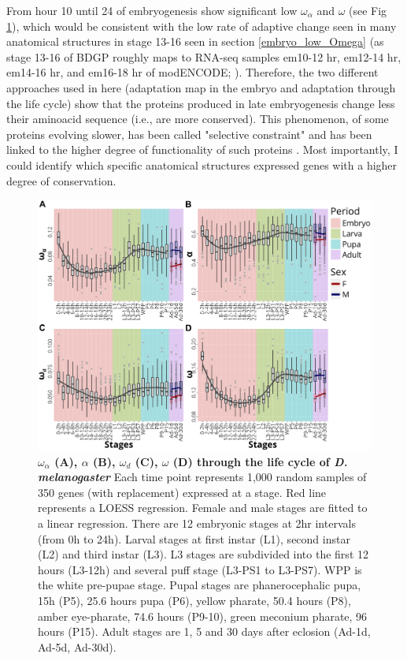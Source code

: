 From hour 10 until 24 of embryogenesis show significant low $\omega_{\alpha}$ and $\omega$ (see Fig \ref{fig:Art-IV-OmegaA_lifecycle}), which would be consistent with the low rate of adaptive change seen in many anatomical structures in stage 13-16 seen in section \ref{embryo_low_Omega} (as stage 13-16 of BDGP roughly maps to RNA-seq samples em10-12 hr, em12-14 hr, em14-16 hr, and em16-18 hr of modENCODE; \citealp{Hammonds2013}).
Therefore, the two different approaches used in here (adaptation map in the embryo and adaptation through the life cycle) show that the proteins produced in late embryogenesis change less their aminoacid sequence (i.e., are more conserved). 
This phenomenon, of some proteins evolving slower, has been called "selective constraint" and has been linked to the higher degree of functionality of such proteins \citep{kimura1983neutral}.
Most importantly, I could identify which specific anatomical structures expressed genes with a higher degree of conservation.

\begin{figure}[t]
  \includegraphics[width=\textwidth]{./Images/Art-IV/OmegaA_lifecycle.png}
  \centering
  \caption{\textbf{ {\large$\omega_{\alpha}$} (A),  {\large$\alpha$} (B), {\large$\omega_{d}$} (C), {\large$\omega$} (D) through the life cycle of \textit{D. melanogaster}} Each time point represents 1,000 random samples of 350 genes (with replacement) expressed at a stage. Red line represents a LOESS regression. Female and male stages are fitted to a linear regression. There are 12 embryonic stages at 2hr intervals (from 0h to 24h). Larval stages at first instar (L1), second instar (L2) and third instar (L3). L3 stages are subdivided into the first 12 hours (L3-12h) and several puff stage (L3-PS1 to L3-PS7). WPP is the white pre-pupae stage. Pupal stages are phanerocephalic pupa, 15h (P5), 25.6 hours pupa (P6), yellow pharate, 50.4 hours (P8), amber eye-pharate, 74.6 hours (P9-10), green meconium pharate, 96 hours (P15). Adult stages are 1, 5 and 30 days after eclosion (Ad-1d, Ad-5d, Ad-30d).
  }
  \label{fig:Art-IV-OmegaA_lifecycle}
\end{figure}

